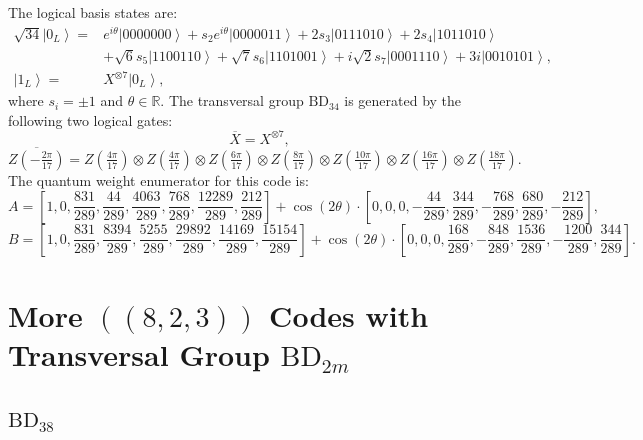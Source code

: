 \documentclass[8pt]{article}
\theoremstyle{definition}
\begin{document}
The logical basis states are:
\begin{align*}
    \sqrt{34}\left|0_{L}\right\rangle = & e^{i\theta}\left|0000000\right\rangle +s_{2}e^{i\theta}\left|0000011\right\rangle +2s_{3}\left|0111010\right\rangle +2s_{4}\left|1011010\right\rangle       \\
                                        & +\sqrt{6}s_{5}\left|1100110\right\rangle +\sqrt{7}s_{6}\left|1101001\right\rangle +i\sqrt{2}s_{7}\left|0001110\right\rangle +3i\left|0010101\right\rangle , \\
    \left|1_{L}\right\rangle =          & X^{\otimes7}\left|0_{L}\right\rangle ,
\end{align*}
where \(s_i = \pm 1\) and \(\theta \in \mathbb{R}\). The transversal group \(\mathrm{BD}_{34}\) is generated by the following two logical gates:
\[ \overline{X}=X^{\otimes7}, \]
\[ \overline{Z\left(-\tfrac{2\pi}{17}\right)}=Z\left(\tfrac{4\pi}{17}\right)\otimes Z\left(\tfrac{4\pi}{17}\right)\otimes Z\left(\tfrac{6\pi}{17}\right)\otimes Z\left(\tfrac{8\pi}{17}\right)\otimes Z\left(\tfrac{10\pi}{17}\right)\otimes Z\left(\tfrac{16\pi}{17}\right)\otimes Z\left(\tfrac{18\pi}{17}\right).\]
The quantum weight enumerator for this code is:
\[ A=\left[1,0,\frac{831}{289},\frac{44}{289},\frac{4063}{289},\frac{768}{289},\frac{12289}{289},\frac{212}{289}\right]+\cos(2\theta)\cdot\left[0,0,0,-\frac{44}{289},\frac{344}{289},-\frac{768}{289},\frac{680}{289},-\frac{212}{289}\right], \]
\[ B=\left[1,0,\frac{831}{289},\frac{8394}{289},\frac{5255}{289},\frac{29892}{289},\frac{14169}{289},\frac{15154}{289}\right]+\cos(2\theta)\cdot\left[0,0,0,\frac{168}{289},-\frac{848}{289},\frac{1536}{289},-\frac{1200}{289},\frac{344}{289}\right]. \]

\section{More \texorpdfstring{$((8,2,3))$}{((8,2,3))} Codes with Transversal Group \texorpdfstring{$\mathrm{BD}_{2m}$}{BD₂ₘ}}\label{appendix:823-BD2m}

\subsection{\texorpdfstring{$\mathrm{BD}_{38}$}{BD₃₈}}
\end{document}
